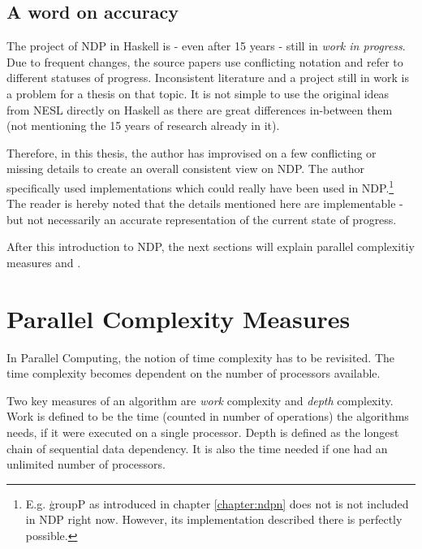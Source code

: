   \subsection*{A word on accuracy}
    The project of NDP in Haskell is - even after 15 years -
    still in \textit{work in progress}. Due to frequent changes,
    the source papers use conflicting notation and refer to
    different statuses of progress. Inconsistent literature and a project
    still in work is a problem for a thesis on that topic.
    It is not simple to use the original ideas from NESL directly
    on Haskell as there are great differences in-between them (not mentioning
    the 15 years of research already in it).
    
    Therefore, in this thesis, the author has improvised on a few conflicting or
    missing details to create an overall consistent view on NDP.
    The author specifically used implementations which could really have been
    used in NDP.\footnote{E.g. \c{groupP} as introduced in chapter \ref{chapter:ndpn} does not
    is not included in NDP right now. However, its implementation described there is perfectly possible.}
    The reader is hereby noted that the details
    mentioned here are implementable - but not necessarily an accurate
    representation of the current state of progress.
    
    After this introduction to NDP, the next sections will explain
    parallel complexitiy measures and \algo.
  
\section{Parallel Complexity Measures}
  \label{section:parmeasures}
  In Parallel Computing, the notion of time complexity
  has to be revisited. The time complexity becomes dependent on the
  number of processors available.
  
  Two key measures of an algorithm are \emph{work} complexity
  and \emph{depth} complexity. Work is defined
  to be the time (counted in number of operations)
  the algorithms needs, if it were executed on a single processor.
  Depth is defined as the longest chain of sequential data dependency.
  It is also the time needed if one had an unlimited number of processors.
  
